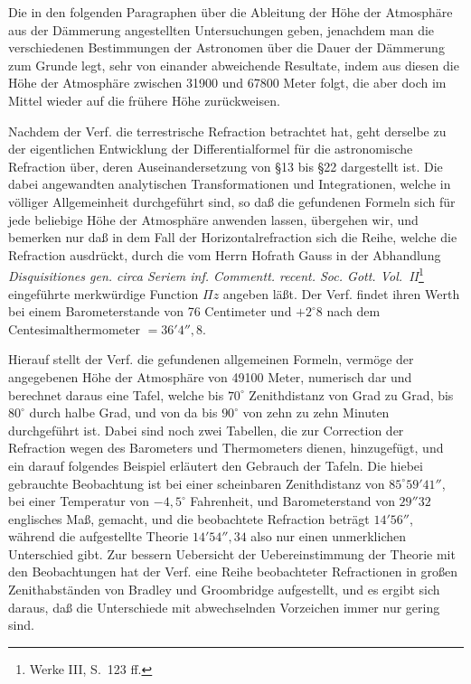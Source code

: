 \documentclass[12pt,a4paper]{article}
\theoremstyle{plain}
\theoremstyle{definition}
\theoremstyle{remark}
\begin{document}
Die in den folgenden Paragraphen \"uber die Ableitung der H\"ohe der Atmosph\"are aus der D\"ammerung angestellten Untersuchungen geben, jenachdem man die verschiedenen Bestimmungen der Astronomen \"uber die Dauer der D\"ammerung zum Grunde legt, sehr von einander abweichende Resultate, indem aus diesen die H\"ohe der Atmosph\"are zwischen 31900 und 67800 Meter folgt, die aber doch im Mittel wieder auf die fr\"uhere H\"ohe zur\"uckweisen.

Nachdem der Verf. die terrestrische Refraction betrachtet hat, geht derselbe zu der eigentlichen Entwicklung der Differentialformel f\"ur die astronomische Refraction \"uber, deren Auseinandersetzung von \S 13 bis \S 22 dargestellt ist. Die dabei angewandten analytischen Transformationen und Integrationen, welche in v\"olliger Allgemeinheit durchgef\"uhrt sind, so da\ss{} die gefundenen Formeln sich f\"ur jede beliebige H\"ohe der Atmosph\"are anwenden lassen, \"ubergehen wir, und bemerken nur da\ss{} in dem Fall der Horizontalrefraction sich die Reihe, welche die Refraction ausdr\"uckt, durch die vom Herrn Hofrath Gauss in der Abhandlung \emph{Disquisitiones gen. circa Seriem inf. Commentt. recent. Soc. Gott. Vol.~II}\footnote{Werke III, S.~123 ff.} eingef\"uhrte merkw\"urdige Function $\Pi z$ angeben l\"a\ss t. Der Verf. findet ihren Werth bei einem Barometerstande von 76 Centimeter und $+2^{\circ}8$ nach dem Centesimalthermometer $= 36'4''{,}8$.

Hierauf stellt der Verf. die gefundenen allgemeinen Formeln, verm\"oge der angegebenen H\"ohe der Atmosph\"are von 49100 Meter, numerisch dar und berechnet daraus eine Tafel, welche bis $70^{\circ}$ Zenithdistanz von Grad zu Grad, bis $80^{\circ}$ durch halbe Grad, und von da bis $90^{\circ}$ von zehn zu zehn Minuten durchgef\"uhrt ist. Dabei sind noch zwei Tabellen, die zur Correction der Refraction wegen des Barometers und Thermometers dienen, hinzugef\"ugt, und ein darauf folgendes Beispiel erl\"autert den Gebrauch der Tafeln. Die hiebei gebrauchte Beobachtung ist bei einer scheinbaren Zenithdistanz von $85^{\circ}59'41''$, bei einer Temperatur von $-4{,}5^{\circ}$ Fahrenheit, und Barometerstand von $29''32$ englisches Ma\ss, gemacht, und die beobachtete Refraction betr\"agt $14'56''$, w\"ahrend die aufgestellte Theorie $14'54''{,}34$ also nur einen unmerklichen Unterschied gibt. Zur bessern Uebersicht der Uebereinstimmung der Theorie mit den Beobachtungen hat der Verf. eine Reihe beobachteter Refractionen in gro\ss en Zenithabst\"anden von Bradley und Groombridge aufgestellt, und es ergibt sich daraus, da\ss{} die Unterschiede mit abwechselnden Vorzeichen immer nur gering sind.
\end{document}
